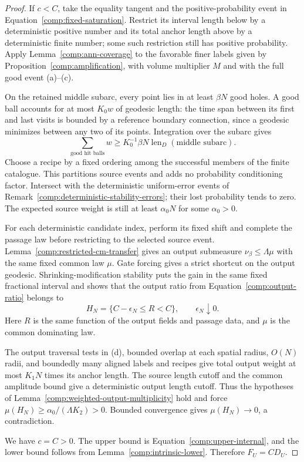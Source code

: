 \begin{proof}
If $c<C$, take the equality tangent and the positive-probability event
in Equation~\eqref{comp:fixed-saturation}.  Restrict its interval length
below by a deterministic positive number and its total anchor length
above by a deterministic finite number; some such restriction still
has positive probability.  Apply Lemma~\ref{comp:ann-coverage} to the
favorable finer labels given by Proposition~\ref{comp:amplification},
with volume multiplier $M$ and with the full good event (a)--(c).

On the retained middle subarc, every point lies in at least $\beta N$
good holes.  A good ball accounts for at most $K_0w$ of geodesic length:
the time span between its first and last visits is bounded by a
reference boundary connection, since a geodesic minimizes between
any two of its points.  Integration over the subarc gives
\[
 \sum_{\text{good hit balls}}w\ge K_0^{-1}\beta N
       \operatorname{len}_D(\text{middle subarc}).
\]
Choose a recipe by a fixed ordering among the successful members of
the finite catalogue.  This partitions source events and adds no
probability conditioning factor.  Intersect with the deterministic
uniform-error events of
Remark~\ref{comp:deterministic-stability-errors}; their lost probability
tends to zero.  The expected source weight is still at least
$\alpha_0N$ for some $\alpha_0>0$.

For each deterministic candidate index, perform its fixed shift and
complete the passage law before restricting to the selected source
event.  Lemma~\ref{comp:restricted-cm-transfer} gives an output
submeasure $\nu_\beta\le\Lambda\mu$ with the same fixed common law
$\mu$.  Gate forcing gives a strict shortcut on the output geodesic.
Shrinking-modification stability puts the gain in the same fixed
fractional interval and shows that the output ratio from Equation~\eqref{comp:output-ratio}
belongs to
\[
 H_N=\{C-\epsilon_N\le R<C\},\qquad \epsilon_N\downarrow0.
\]
Here $R$ is the same function of the output fields and passage data,
and $\mu$ is the common dominating law.

The output traversal tests in (d), bounded overlap at each spatial
radius, $O(N)$ radii, and boundedly many aligned labels and recipes
give total output weight at most $K_1N$ times its anchor length.
The source length cutoff and the common amplitude bound give a
deterministic output length cutoff.  Thus the hypotheses of
Lemma~\ref{comp:weighted-output-multiplicity} hold and force
$\mu(H_N)\ge\alpha_0/(\Lambda K_2)>0$.  Bounded convergence gives
$\mu(H_N)\to0$, a contradiction.

We have $c=C>0$.  The upper bound is
Equation~\eqref{comp:upper-internal}, and the lower bound follows from
Lemma~\ref{comp:intrinsic-lower}.  Therefore $F_U=CD_U$.
\end{proof}

